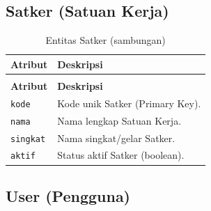 \documentclass[
  12pt,
  a4paper,
  oneside,
  final
]{report}
\begin{document}
\subsection{Satker (Satuan Kerja)}

\begin{longtable}[!htbp]{p{3.5cm} p{9cm}}
  \caption{Entitas Satker}
  \label{tab:entitas-satker} \\
  \toprule
  \textbf{Atribut} & \textbf{Deskripsi} \\
  \midrule
  \endfirsthead
  \caption[]{Entitas Satker (sambungan)} \\
  \toprule
  \textbf{Atribut} & \textbf{Deskripsi} \\
  \midrule
  \endhead
  \bottomrule
  \endfoot

  \texttt{kode}    & Kode unik Satker (Primary Key). \\
  \texttt{nama}    & Nama lengkap Satuan Kerja. \\
  \texttt{singkat}& Nama singkat/gelar Satker. \\
  \texttt{aktif}  & Status aktif Satker (boolean).\\
\end{longtable}

\subsection{User (Pengguna)}
\end{document}
